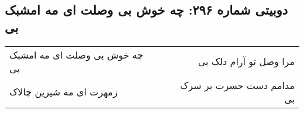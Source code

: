 \begin{center}
\section*{دوبیتی شماره ۲۹۶: چه خوش بی وصلت ای مه امشبک بی}
\label{sec:296}
\begin{longtable}{l p{0.5cm} r}
چه خوش بی وصلت ای مه امشبک بی
&&
مرا وصل تو آرام دلک بی
\\
زمهرت ای مه شیرین چالاک
&&
مدامم دست حسرت بر سرک بی
\\
\end{longtable}
\end{center}
